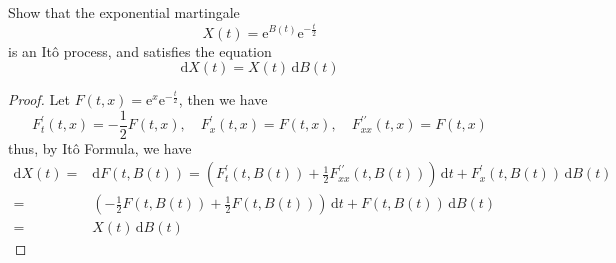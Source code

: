 \begin{example}
	Show that the exponential martingale
	\begin{equation*}
		X(t)=\mathrm{e}^{B(t)}\mathrm{e}^{-\frac{t}{2}}
	\end{equation*}
	is an It\^o process, and satisfies the equation
	\begin{equation*}
		\mathrm{d}X(t)=X(t)\,\mathrm{d}B(t)
	\end{equation*}
\end{example}
\begin{proof}
	Let $F(t,x)=\mathrm{e}^{x}\mathrm{e}^{-\frac{t}{2}}$, then we have
	\begin{equation*}
		F_{t}^{\prime}(t,x)=-\frac{1}{2}F(t,x),\quad F_{x}^{\prime}(t,x)=F(t,x),\quad F_{xx}^{\prime\prime}(t,x)=F(t,x)
	\end{equation*}
	thus, by It\^o Formula, we have
	\begin{equation*}
		\begin{aligned}
			\mathrm{d}X(t)= & \mathrm{d}F(t,B(t))=\left(F_{t}^{\prime}(t,B(t))+\frac{1}{2}F_{xx}^{\prime\prime}(t,B(t))\right)\,\mathrm{d}t+F_{x}^{\prime}(t,B(t))\,\mathrm{d}B(t) \\
			=               & \left(-\frac{1}{2}F(t,B(t))+\frac{1}{2}F(t,B(t))\right)\,\mathrm{d}t+F(t,B(t))\,\mathrm{d}B(t)                                                       \\
			=               & X(t)\,\mathrm{d}B(t)
		\end{aligned}
	\end{equation*}
\end{proof}

\begin{example}

\end{example}

\begin{example}

\end{example}
